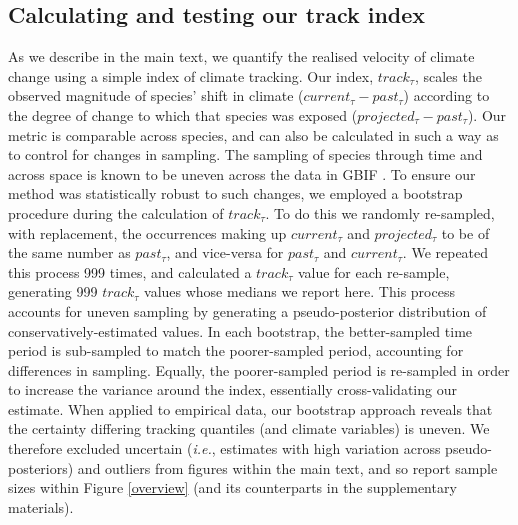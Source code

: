 \documentclass[12pt]{report}
\begin{document}
\subsection*{Calculating and testing our track index}
As we describe in the main text, we quantify the realised velocity of
climate change using a simple index of climate tracking. Our index,
$track_\tau$, scales the observed magnitude of species' shift in
climate ($current_\tau - past_\tau$) according to the degree of change
to which that species was exposed ($projected_\tau - past_\tau$). Our
metric is comparable across species, and can also be calculated in
such a way as to control for changes in sampling. The sampling of
species through time and across space is known to be uneven across the
data in GBIF \supercite{Beck2013,Beck2014}. To ensure our method was
statistically robust to such changes, we employed a bootstrap
procedure during the calculation of $track_\tau$. To do this we
randomly re-sampled, with replacement, the occurrences making up
$current_\tau$ and $projected_\tau$ to be of the same number as
$past_\tau$, and vice-versa for $past_\tau$ and $current_\tau$. We
repeated this process 999 times, and calculated a $track_\tau$ value
for each re-sample, generating 999 $track_\tau$ values whose medians
we report here. This process accounts for uneven sampling by
generating a pseudo-posterior distribution of conservatively-estimated
values. In each bootstrap, the better-sampled time period is
sub-sampled to match the poorer-sampled period, accounting for
differences in sampling. Equally, the poorer-sampled period is
re-sampled in order to increase the variance around the index,
essentially cross-validating our estimate. When applied to empirical
data, our bootstrap approach reveals that the certainty differing
tracking quantiles (and climate variables) is uneven. We therefore
excluded uncertain (\emph{i.e.}, estimates with high variation across
pseudo-posteriors) and outliers from figures within the main text, and
so report sample sizes within Figure \ref{overview} (and its
counterparts in the supplementary materials).
\end{document}
